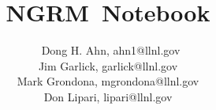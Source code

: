 \documentclass[10pt]{article}
\newcommand{\ngrm}{NGRM}
\begin{document}
\title{\ngrm\ Notebook}
\author{\
Dong H. Ahn, ahn1@llnl.gov\\
Jim Garlick, garlick@llnl.gov\\
Mark Grondona, mgrondona@llnl.gov\\
Don Lipari, lipari@llnl.gov}





%
%
\end{document}
